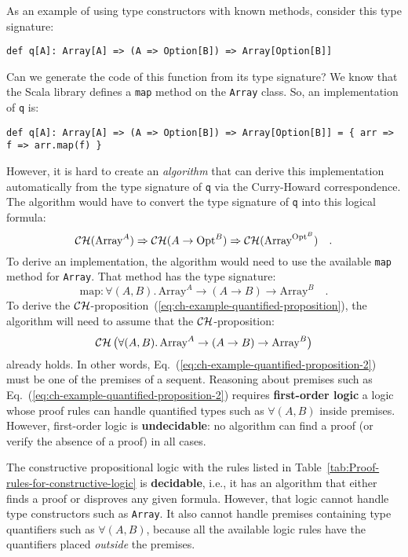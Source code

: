 As an example of using type constructors with known methods, consider
this type signature:
\begin{lstlisting}
def q[A]: Array[A] => (A => Option[B]) => Array[Option[B]]
\end{lstlisting}
Can we generate the code of this function from its type signature?
We know that the Scala library defines a \lstinline!map! method on
the \lstinline!Array! class. So, an implementation of \lstinline!q!
is:
\begin{lstlisting}
def q[A]: Array[A] => (A => Option[B]) => Array[Option[B]] = { arr => f => arr.map(f) }
\end{lstlisting}
However, it is hard to create an \emph{algorithm} that can derive
this implementation automatically from the type signature of \lstinline!q!
via the Curry-Howard correspondence. The algorithm would have to convert
the type signature of \lstinline!q! into this logical formula:
\begin{equation}
{\cal CH}(\text{Array}^{A})\Rightarrow{\cal CH}(A\rightarrow\text{Opt}^{B})\Rightarrow{\cal CH}(\text{Array}^{\text{Opt}^{B}})\quad.\label{eq:ch-example-quantified-proposition}
\end{equation}
To derive an implementation, the algorithm would need to use the available
\lstinline!map! method for \lstinline!Array!. That method has the
type signature:
\[
\text{map}:\forall(A,B).\,\text{Array}^{A}\rightarrow\left(A\rightarrow B\right)\rightarrow\text{Array}^{B}\quad.
\]
To derive the ${\cal CH}$-proposition~(\ref{eq:ch-example-quantified-proposition}),
the algorithm will need to assume that the ${\cal CH}$-proposition:
\begin{equation}
{\cal CH}\,\big(\forall(A,B).\,\text{Array}^{A}\rightarrow\left(A\rightarrow B\right)\rightarrow\text{Array}^{B}\big)\label{eq:ch-example-quantified-proposition-2}
\end{equation}
already holds. In other words, Eq.~(\ref{eq:ch-example-quantified-proposition-2})
must be one of the premises of a sequent. Reasoning about premises
such as Eq.~(\ref{eq:ch-example-quantified-proposition-2}) requires
\textbf{first-order logic} \textemdash{}
a logic whose proof rules can handle quantified types such as $\forall(A,B)$\emph{
}inside premises. However, first-order logic is \textbf{undecidable}:
no algorithm can find a proof (or verify the absence of a proof) in
all cases. 

The constructive propositional logic with the rules listed in Table~\ref{tab:Proof-rules-for-constructive-logic}
is \textbf{decidable}, i.e., it has an algorithm
that either finds a proof or disproves any given formula. However,
that logic cannot handle type constructors such as \lstinline!Array!.
It also cannot handle premises containing type quantifiers such as
$\forall(A,B)$, because all the available logic rules have the quantifiers
placed \emph{outside} the premises. 

